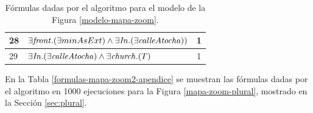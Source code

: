 \begin{table}[h]
\begin{center}
\begin{tabular}{|l|l|c|}
28&$\exists \mathit{front} . (\exists minAsExt) \land \exists \mathit{In} .(\exists \mathit{calleAtocha}))$ &1\\ \hline

29&$\exists  \mathit{In} .(\exists \mathit{calleAtocha}) \land \exists \mathit{church}.(T)$ &1\\ \hline

\end{tabular}

\caption{F\'ormulas dadas por el algoritmo para el modelo de la Figura \protect\ref{modelo-mapa-zoom}.}\label{formulas-mapa-zoom-ap}
\end{center}
\end{table}



En la Tabla \ref{formulas-mapa-zoom2-apendice} se muestran las f\'ormulas dadas por el algoritmo en 1000 ejecuciones para la Figura \ref{mapa-zoom-plural}, mostrado en la Secci\'on \ref{sec:plural}. 

